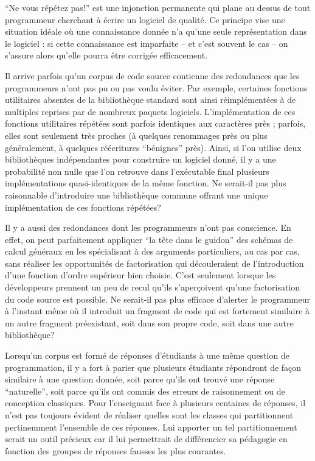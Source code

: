 
``Ne vous répétez pas!'' est une injonction permanente qui plane au
dessus de tout programmeur cherchant à écrire un logiciel de qualité.
Ce principe vise une situation idéale où une connaissance donnée n'a
qu'une seule représentation dans le logiciel : si cette connaissance
est imparfaite -- et c'est souvent le cas -- on s'assure alors qu'elle
pourra être corrigée efficacement.

Il arrive parfois qu'un corpus de code source contienne des
redondances que les programmeurs n'ont pas pu ou pas voulu éviter. Par
exemple, certaines fonctions utilitaires absentes de la bibliothèque
standard sont ainsi réimplémentées à de multiples reprises par de
nombreux paquets logiciels. L'implémentation de ces fonctions
utilitaires répétées sont parfois identiques aux caractères près ;
parfois, elles sont seulement très proches (à quelques renommages près
ou plus généralement, à quelques réécritures ``bénignes''
près). Ainsi, si l'on utilise deux bibliothèques indépendantes pour
construire un logiciel donné, il y a une probabilité non nulle que
l'on retrouve dans l'exécutable final plusieurs implémentations
quasi-identiques de la même fonction. Ne serait-il pas plus
raisonnable d'introduire une bibliothèque commune offrant une unique
implémentation de ces fonctions répétées?

Il y a aussi des redondances dont les programmeurs n'ont pas conscience.
En effet, on peut parfaitement appliquer ``la tête dans le guidon''
des schémas de calcul généraux en les spécialisant à des arguments
particuliers, au cas par cas, sans réaliser les opportunités de
factorisation qui découleraient de l'introduction d'une fonction
d'ordre supérieur bien choisie. C'est seulement lorsque les
développeurs prennent un peu de recul qu'ils s'aperçoivent qu'une
factorisation du code source est possible. Ne serait-il pas plus
efficace d'alerter le programmeur à l'instant même où il introduit
un fragment de code qui est fortement similaire à un autre fragment
préexistant, soit dans son propre code, soit dans une autre
bibliothèque?

Lorsqu'un corpus est formé de réponses d'étudiants à une même question
de programmation, il y a fort à parier que plusieurs étudiants
répondront de façon similaire à une question donnée, soit parce qu'ils
ont trouvé une réponse ``naturelle'', soit parce qu'ils ont commis des
erreurs de raisonnement ou de conception classiques.  Pour
l'enseignant face à plusieurs centaines de réponses, il n'est pas
toujours évident de réaliser quelles sont les classes qui
partitionnent pertinemment l'ensemble de ces réponses. Lui apporter un
tel partitionnement serait un outil précieux car il lui permettrait de
différencier sa pédagogie en fonction des groupes de réponses fausses
les plus courantes.

